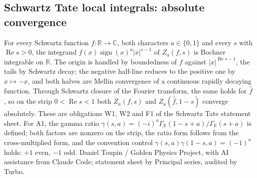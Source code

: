 \documentclass{report}
\theoremstyle{definition}
\begin{document}
\begin{itemize}
\begin{itemize}
\section{Schwartz Tate local integrals: absolute convergence}
For every Schwartz function $f:\mathbb R\to\mathbb C$, both characters $a\in\{0,1\}$ and every $s$ with $\operatorname{Re}s>0$, the integrand $f(x)\operatorname{sign}(x)^a|x|^{s-1}$ of $Z_a(f,s)$ is Bochner integrable on $\mathbb R$. The origin is handled by boundedness of $f$ against $|x|^{\operatorname{Re}s-1}$, the tails by Schwartz decay; the negative half-line reduces to the positive one by $x\mapsto-x$, and both halves are Mellin convergence of a continuous rapidly decaying function. Through Schwartz closure of the Fourier transform, the same holds for $\widehat f$, so on the strip $0<\operatorname{Re}s<1$ both $Z_a(f,s)$ and $Z_a(\widehat f,1-s)$ converge absolutely. These are obligations W1, W2 and F1 of the Schwartz Tate statement sheet. For A1, the gamma ratio $\gamma(s,a)=(-i)^a\Gamma_{\mathbb R}(1-s+a)/\Gamma_{\mathbb R}(s+a)$ is defined; both factors are nonzero on the strip, the ratio form follows from the cross-multiplied form, and the convention control $\gamma(s,a)\gamma(1-s,a)=(-1)^a$ holds: $+1$ even, $-1$ odd.
Daniel Toupin / Golden Physics Project, with AI assistance from Claude Code; statement sheet by Principal series, audited by Turbo.


\end{itemize}
\end{itemize}
\end{document}
